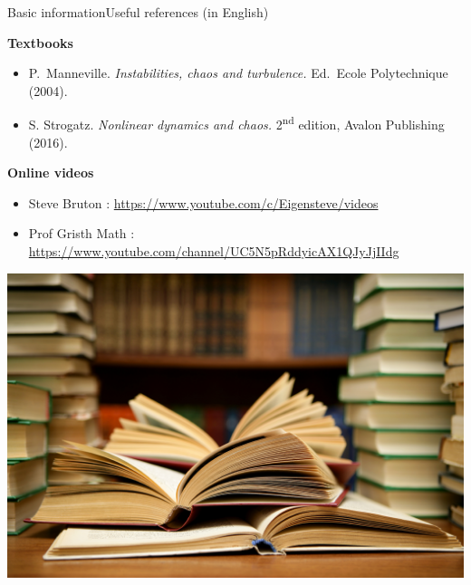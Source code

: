 \documentclass[usenames,dvipsnames,svgnames,10pt,aspectratio=169]{beamer}
\begin{document}
\begin{frame}[t, c]{Basic information}{Useful references (in English)}
  \begin{minipage}{.58\textwidth}
    \begin{block}{\centering \textbf{Textbooks}}
      \begin{itemize}
        \item P.\ Manneville. \emph{Instabilities, chaos and turbulence.} Ed.\ Ecole Polytechnique (2004).

          \medskip

        \item S. Strogatz. \emph{Nonlinear dynamics and chaos.} 2\textsuperscript{nd} edition, Avalon Publishing (2016).
      \end{itemize}
    \end{block}%
    \vfill
    \begin{block}{\centering \textbf{Online videos}}
      \begin{itemize}
      \item Steve Bruton : \url{https://www.youtube.com/c/Eigensteve/videos}

        \medskip

      \item Prof Gristh Math : \url{https://www.youtube.com/channel/UC5N5pRddyicAX1QJyJjIIdg}
      \end{itemize}
    \end{block}


  \end{minipage}%
  \hfill
  \begin{minipage}{.38\textwidth}
		\centering
		\includegraphics[width=\textwidth]{references}
  \end{minipage}

  \vspace{1cm}
\end{frame}
\end{document}
